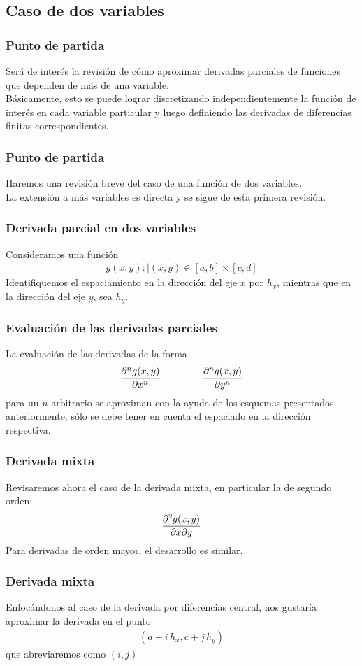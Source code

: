 \subsection{Caso de dos variables}
\begin{frame}
\frametitle{Punto de partida}
Será de interés la revisión de cómo aproximar derivadas parciales de funciones que dependen de más de una variable.
\\
\bigskip
\pause
Básicamente, esto se puede lograr discretizando independientemente la función de interés en cada variable particular y luego definiendo las derivadas de diferencias finitas correspondientes.
\end{frame}
\begin{frame}
\frametitle{Punto de partida}
Haremos una revisión breve del caso de una función de dos variables.
\\
\bigskip
La extensión a más variables es directa y se sigue de esta primera revisión.
\end{frame}
\begin{frame}
\frametitle{Derivada parcial en dos variables}
Consideramos una función
\begin{align*}
g(x,y) :| (x, y) \in [a, b] \times [c, d]
\end{align*}
\pause
Identifiquemos el espaciamiento en la dirección del eje $x$ por $h_{x}$, mientras que en la dirección del eje $y$, sea $h_{y}$.
\end{frame}
\begin{frame}
\frametitle{Evaluación de las derivadas parciales}
La evaluación de las derivadas de la forma
\begin{align*}
\pdv[n]{g(x,y)}{x} \hspace{1.5cm} \pdv[n]{g(x, y)}{y}
\end{align*}
para un $n$ arbitrario se aproximan con la ayuda de los esquemas presentados anteriormente, sólo se debe tener en cuenta el espaciado en la dirección respectiva.
\end{frame}
\begin{frame}
\frametitle{Derivada mixta}
Revisaremos ahora el caso de la derivada mixta, en particular la de segundo orden:
\begin{align*}
\pdv[2]{g(x, y)}{x}{y}
\end{align*}
Para derivadas de orden mayor, el desarrollo es similar.
\end{frame}
\begin{frame}
\frametitle{Derivada mixta}
Enfocándonos al caso de la derivada por diferencias central, nos gustaría aproximar la derivada en el punto
\begin{align*}
(a + i \, h_{x}, c + j\, h_{y})
\end{align*}
que abreviaremos como $(i, j)$
\end{frame}
